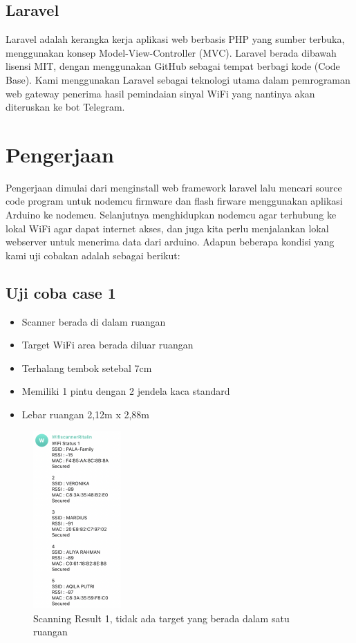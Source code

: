 \documentclass[conference]{IEEEtran}
\begin{document}
\subsection{Laravel}
Laravel adalah kerangka kerja aplikasi web berbasis PHP yang sumber terbuka, menggunakan konsep Model-View-Controller (MVC). Laravel berada dibawah lisensi MIT, dengan menggunakan GitHub sebagai tempat berbagi kode (Code Base). Kami menggunakan Laravel sebagai teknologi utama dalam pemrograman web gateway penerima hasil pemindaian sinyal WiFi yang nantinya akan diteruskan ke bot Telegram.

\section{Pengerjaan}\label{pengerjaan}
Pengerjaan dimulai dari menginstall web framework laravel lalu mencari source code program untuk nodemcu firmware dan flash firware menggunakan aplikasi Arduino ke nodemcu. Selanjutnya menghidupkan nodemcu agar terhubung ke lokal WiFi agar dapat internet akses, dan juga kita perlu menjalankan lokal webserver untuk menerima data dari arduino. Adapun beberapa kondisi yang kami uji cobakan adalah sebagai berikut:

\subsection{Uji coba case 1}

\begin{itemize}
  \item Scanner berada di dalam ruangan
  \item Target WiFi area berada diluar ruangan
  \item Terhalang tembok setebal 7cm 
  \item Memiliki 1 pintu dengan 2 jendela kaca standard
  \item Lebar ruangan 2,12m x 2,88m
\end{itemize}

\begin{figure}[h]
  \centering
  \includegraphics[width=0.30\textwidth]{scanning-result.png}
  \caption{Scanning Result 1, tidak ada target yang berada dalam satu ruangan}
\end{figure}
\end{document}
